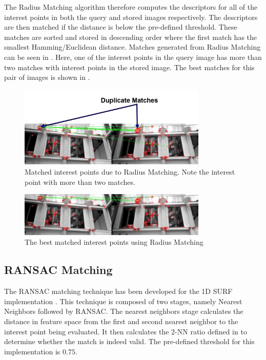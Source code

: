 The Radius Matching algorithm therefore computes the descriptors for all of the interest points in both the query and stored images respectively. The descriptors are then matched if the distance is below the pre-defined threshold. These matches are sorted and stored in descending order where the first match has the smallest Hamming/Euclidean distance. Matches generated from Radius Matching can be seen in . Here, one of the interest points in the query image has more than two matches with interest points in the stored image. The best matches for this pair of images is shown in .\\ 


 \begin{figure}[h!] 
  \centering
    \includegraphics[width=0.8\textwidth]{../Drawings/Matching/feature_matching/dataset1_without_validation_radius_photo.jpg}
    \caption{Matched interest points due to Radius Matching. Note the interest point with more than two matches.}
    \label{fig:radius_match}
\end{figure}

 \begin{figure}[h!] 
  \centering
    \includegraphics[width=0.8\textwidth]{../Drawings/Matching/feature_matching/dataset1_without_validation_radius_best.jpg}
    \caption{The best matched interest points using Radius Matching}
    \label{fig:radius_best_match}
\end{figure}

\subsection{RANSAC Matching}
\label{sec:ransacMatching}
The RANSAC matching technique has been developed for the 1D SURF implementation \citep{Anderson}. This technique is composed of two stages, namely Nearest Neighbors followed by RANSAC. The nearest neighbors stage calculates the distance in feature space from the first and second nearest neighbor to the interest point being evaluated. It then calculates the 2-NN ratio defined in  to determine whether the match is indeed valid. The pre-defined threshold for this implementation is $0.75$.\\

